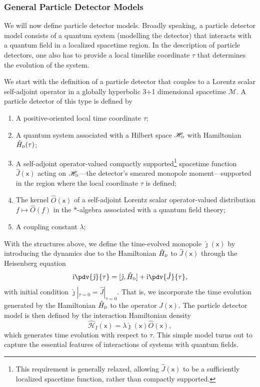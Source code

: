 \documentclass[letterpaper,12pt,titlepage,oneside,final]{book}
\newcommand{\M}{\mathcal{M}}
\newcommand{\mf}{\mathsf}%
\newcommand{\ii}{\mathrm{i}}
\newcommand{\tc}[1]{\textsc{#1}}
\begin{document}
\subsubsection*{General Particle Detector Models}

We will now define particle detector models. Broadly speaking, a particle detector model consists of a quantum system (modelling the detector) that interacts with a quantum field in a localized spacetime region. In the description of particle detectors, one also has to provide a local timelike coordinate $\tau$ that determines the evolution of the system. 

We start with the definition of a particle detector that couples to a Lorentz scalar self-adjoint operator in a globally hyperbolic 3+1 dimensional spacetime $\M$. A particle detector of this type is defined by
\begin{enumerate}
    \item[\textbf{1.}] A positive-oriented local time coordinate $\tau$;
    \item[\textbf{2.}] A quantum system associated with a Hilbert space $\mathscr{H}_\tc{d}$ with Hamiltonian $\hat{H}_\tc{d}(\tau)$;
    \item[\textbf{3.}] A self-adjoint operator-valued compactly supported\footnote{This requirement is generally relaxed, allowing $\hat{J}(\mf x)$ to be a sufficiently localized spacetime function, rather than compactly supported.} spacetime function $\hat{J}(\mf x)$ acting on $\mathscr{H}_\tc{d}$---the detector's smeared monopole moment---supported in the region where the local coordinate $\tau$ is defined; 
    \item[\textbf{4.}] The kernel $\hat{O}(\mf x)$ of a self-adjoint Lorentz scalar operator-valued distribution \mbox{$f\mapsto \hat{O}(f)$} in the $\ast$-algebra associated with a quantum field theory;
    \item[\textbf{5.}] A coupling constant $\lambda$;
\end{enumerate}
With the structures above, we define the time-evolved monopole $\hat{\jmath}(\mf x)$ by introducing the dynamics due to the Hamiltonian $\hat{H}_\tc{d}$ to $\hat{J}(\mf x)$ through the Heisenberg equation
\begin{equation}
    \ii \pdv{\hat{\jmath}}{\tau} = [\hat{\jmath},\hat{H}_\tc{d}] + \ii \pdv{\hat{J}}{\tau},
\end{equation}
with initial condition $\hat{\jmath}|_{\tau = 0} = \hat{J}|_{\tau = 0}$. That is, we incorporate the time evolution generated by the Hamiltonian $\hat{H}_\tc{d}$ to the operator $\hat{J}(\mf x)$. The particle detector model is then defined by the interaction Hamiltonian density
\begin{equation}
    \hat{\mathcal{H}}_I(\mf x) = \lambda \hat{\jmath}(\mf x) \hat{O}(\mf x),
\end{equation}
which generates time evolution with respect to $\tau$. This simple model turns out to capture the essential features of interactions of systems with quantum fields.
\end{document}
